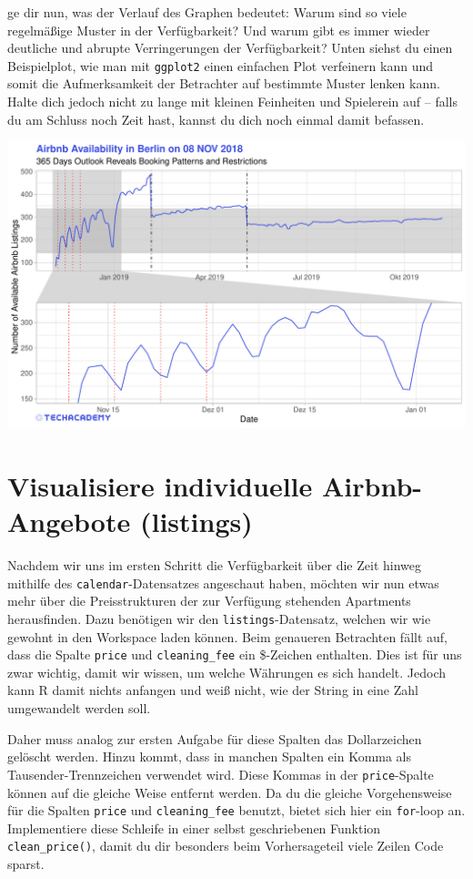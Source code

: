 \documentclass[
]{book}
\begin{document}
ge dir nun, was der Verlauf des Graphen bedeutet: Warum sind so viele regelmäßige Muster in der Verfügbarkeit?
Und warum gibt es immer wieder deutliche und abrupte Verringerungen der Verfügbarkeit?
Unten siehst du einen Beispielplot, wie man mit \texttt{ggplot2} einen einfachen Plot verfeinern kann und somit die Aufmerksamkeit der Betrachter auf bestimmte Muster lenken kann.
Halte dich jedoch nicht zu lange mit kleinen Feinheiten und Spielerein auf -- falls du am Schluss noch Zeit hast, kannst du dich noch einmal damit befassen.

\includegraphics[width=1\linewidth]{plots/1_3_AvailabilityOutlook_advanced}

\hypertarget{visualisiere-individuelle-airbnb-angebote-listings}{%
\section{Visualisiere individuelle Airbnb-Angebote (listings)}\label{visualisiere-individuelle-airbnb-angebote-listings}}

Nachdem wir uns im ersten Schritt die Verfügbarkeit über die Zeit hinweg mithilfe des \texttt{calendar}-Datensatzes angeschaut haben, möchten wir nun etwas mehr über die Preisstrukturen der zur Verfügung stehenden Apartments herausfinden.
Dazu benötigen wir den \texttt{listings}-Datensatz, welchen wir wie gewohnt in den Workspace laden können.
Beim genaueren Betrachten fällt auf, dass die Spalte \texttt{price} und \texttt{cleaning\_fee} ein \$-Zeichen enthalten.
Dies ist für uns zwar wichtig, damit wir wissen, um welche Währungen es sich handelt.
Jedoch kann R damit nichts anfangen und weiß nicht, wie der String in eine Zahl umgewandelt werden soll.

Daher muss analog zur ersten Aufgabe für diese Spalten das Dollarzeichen gelöscht werden.
Hinzu kommt, dass in manchen Spalten ein Komma als Tausender-Trennzeichen verwendet wird.
Diese Kommas in der \texttt{price}-Spalte können auf die gleiche Weise entfernt werden.
Da du die gleiche Vorgehensweise für die Spalten \texttt{price} und \texttt{cleaning\_fee} benutzt, bietet sich hier ein \texttt{for}-loop an.
Implementiere diese Schleife in einer selbst geschriebenen Funktion \texttt{clean\_price()}, damit du dir besonders beim Vorhersageteil viele Zeilen Code sparst.
\end{document}
